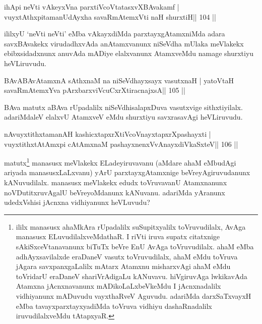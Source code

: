 \begin{shl}
ihApi neVti vAkeyxVna parxtiVcoV\s tatasxvXBAvakamf |
vuyxtAthxpitamanUdAyx\s\s ha savaRmAtemxVti naH shurxtiH\hfill || 104 ||
\end{shl}

\begin{artha}
ililxyU `neVti neVti' eMba vAkayxdiMda parxtayxgAtamxniMda adara savxBAvakekx virudadhxvAda anAtamxvanunx niSeVdha mUlaka meVlakekx ebibxsidadxnunx anuvAda mADiye elalxvanunx AtamxveMdu namage shurxtiyu heVLiruvudu.
\end{artha}


\begin{shl}
BAvABAvAtamxnA sAthxnaM na niSeVdhayxsayx vasutxnaH |
yatoV\s taH savaRmAtemxYva pArxbarxviVcuCxrXtiracnajxsA\hfill || 105 ||
\end{shl}

\begin{artha}
BAva matutx aBAva rUpadalilx niSeVdhisalapxDuva vasutxvige sithxtiyilalx. adariMdaleV elalxvU AtamxveV eMdu shurxtiyu savxrasavAgi heVLiruvudu.
\end{artha}

\begin{shl}
nAvuyxtithxtamanAH kashicxtapxrXtiVcoV\s nayxtapxrXpashayxti |
vuyxtithxtAtAmx\s pi cA\s\s tAmxnaM pashayxnenxVvAnayxdiVkaSxteV\hfill || 106 ||
\end{shl}

\begin{artha}
matutx\footnote[1]{ililx manasusx ahaMkAra rUpadalilx suSupitxyalilx
  toVruvudilalx, AvAga manasusx ELuvudilalxveMdathaR. I riVti iruva
  supatx citatxnige sAkiSxceVtanavanunx biTuTx beVre EnU
  AvAga toVruvudilalx. ahaM eMba adhAyxsavilalxde eraDaneV vasutx
  toVruvudilalx, ahaM eMdu toVruva jAgara savxpanxgaLalilx mAtarx
  Atamxnu misharxvAgi ahaM eMdu toVridarU eraDaneV shariVrAdigaLu
  kANuvavu. hiVgiruvAga lwkikavAda Atamxna jAcnxnavanunx
  mADikoLaLxbeVkeMdu I jAcnxnadalilx vidhiyanunx mADuvudu vayxthaRveV
  Aguvudu. adariMda darxSaTxvayxH eMba tavayxparxtayxyadiMda toVruva
  vidhiyu dashaRnadalilx iruvudilalxveMdu tAtapxyaR.} manasusx 
  meVlakekx ELadeyiruvavanu (aMdare ahaM eMbudAgi ariyada 
  manasusxLaLxvanu) yArU parxtayxgAtamxnige 
beVreyAgiruvudanunx kANuvudilalx. manasusx meVlakekx edudx toVruvavanU
Atamxnanunx noVDutitxruvAgalU beVreyoMdanunx kANuvanu. adariMda
yAranunx udedxVshisi jAcnxna vidhiyanunx heVLuvudu?
\end{artha}

